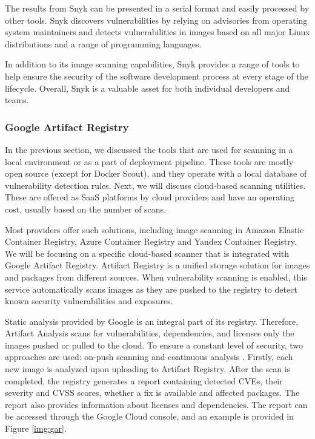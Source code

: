 The results from Snyk can be presented in a serial format and easily processed by other tools. Snyk discovers vulnerabilities by relying on advisories from operating system maintainers and detects vulnerabilities in images based on all major Linux distributions and a range of programming languages.

In addition to its image scanning capabilities, Snyk provides a range of tools to help ensure the security of the software development process at every stage of the lifecycle. Overall, Snyk is a valuable asset for both individual developers and teams.

\subsubsection{Google Artifact Registry}

In the previous section, we discussed the tools that are used for scanning in a local environment or as a part of deployment pipeline. These tools are mostly open source (except for Docker Scout), and they operate with a local database of vulnerability detection rules. Next, we will discuss cloud-based scanning utilities. These are offered as SaaS platforms by cloud providers and have an operating cost, usually based on the number of scans. 

Most providers offer such solutions, including image scanning in Amazon Elastic Container Registry, Azure Container Registry and Yandex Container Registry. We will be focusing on a specific cloud-based scanner that is integrated with Google Artifact Registry. Artifact Registry is a unified storage solution for images and packages from different sources. When vulnerability scanning is enabled, this service automatically scans images as they are pushed to the registry to detect known security vulnerabilities and exposures.

Static analysis provided by Google is an integral part of its registry. Therefore, Artifact Analysis scans for vulnerabilities, dependencies, and licenses only the images pushed or pulled to the cloud. To ensure a constant level of security, two approaches are used: on-push scanning and continuous analysis \cite{d:gcp}. Firstly, each new image is analyzed upon uploading to Artifact Registry. After the scan is completed, the registry generates a report containing detected CVEs, their severity and CVSS scores, whether a fix is available and affected packages. The report also provides information about licenses and dependencies. The report can be accessed through the Google Cloud console, and an example is provided in Figure \ref{img:gar}.


